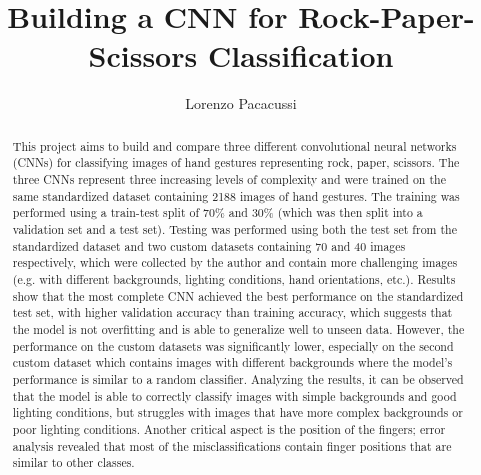 \documentclass[runningheads]{llncs}
\begin{document}
%
\title{Building a CNN for Rock-Paper-Scissors Classification}
%
%
\author{Lorenzo Pacacussi}
%
%

%
\maketitle              %
%
\begin{abstract}
This project aims to build and compare three different convolutional neural networks (CNNs) for classifying images of hand gestures representing rock, paper, scissors. 
The three CNNs represent three increasing levels of complexity and were trained on the same standardized dataset containing 2188 images of hand gestures.
The training was performed using a train-test split of 70\% and 30\% (which was then split into a validation set and a test set).
Testing was performed using both the test set from the standardized dataset and two custom datasets containing 70 and 40 images respectively, which were collected by the author and contain more challenging images (e.g. with different backgrounds, lighting conditions, hand orientations, etc.).
Results show that the most complete CNN achieved the best performance on the standardized test set, with higher validation accuracy than training accuracy, which suggests that the model is not overfitting and is able to generalize well to unseen data.
However, the performance on the custom datasets was significantly lower, especially on the second custom dataset which contains images with different backgrounds where the model's performance is similar to a random classifier.
Analyzing the results, it can be observed that the model is able to correctly classify images with simple backgrounds and good lighting conditions, but struggles with images that have more complex backgrounds or poor lighting conditions. Another critical aspect is the position of the fingers; error analysis revealed that most of the misclassifications contain finger positions that are similar to other classes.






\end{abstract}
%
%
%
\end{document}
